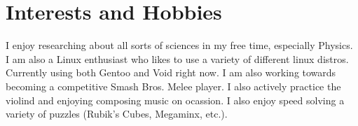 \documentclass{cv}
\begin{document}
\section{Interests and Hobbies}
\begin{adjustwidth}{0.5cm}{0.5cm}

I enjoy researching about all sorts of sciences in my free time, especially
Physics. I am also a Linux enthusiast who likes to use a variety of different
linux distros. Currently using both Gentoo and Void right now. I am also
working towards becoming a competitive Smash Bros. Melee player. I also actively
practice the violind and enjoying composing music on ocassion. I also enjoy
speed solving a variety of puzzles (Rubik's Cubes, Megaminx, etc.).

\end{adjustwidth}


\end{document}
